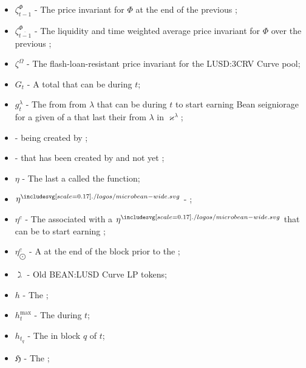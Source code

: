 \documentclass[class=article, crop=false]{standalone}
\begin{document}
\begin{itemize}[topsep=0pt, itemsep=3pt,leftmargin=16pt]
    \item[] $\zeta^{\Phi}_{t-1}$ - \hypertarget{ht97}{The price invariant for $\Phi$ at the end of the previous };
    \item[] $\zeta^{\Phi}_{\overline{t-1}}$ - \hypertarget{ht98}{The liquidity and time weighted average price invariant for $\Phi$ over the previous };
    \item[] $\zeta^{\Omega}$ - \hypertarget{ht99}{The flash-loan-resistant price invariant for the LUSD:3CRV Curve pool};
    \item[] $G_t$ - \hypertarget{ht100}{A  total  that can be  during $t$};
    \item[] $g_{t}^{\lambda}$ - \hypertarget{ht101}{The  from  from \hyperlink{ht126}{$\lambda$}  that can be  during $t$ to start earning Bean seigniorage for a given  of a  that last  their  from \hyperlink{ht126}{$\lambda$}  in $\varkappa^{\lambda}$};
    \item[]  - \hypertarget{ht102}{ being created by };
    \item[]  - \hypertarget{ht103}{ that has been created by  and not yet };
    \item[] $\eta$ - \hypertarget{ht104}{The last  a  called the  function};
    \item[] $\eta^{\bean}$ - \hypertarget{ht105}{ \Bean};
    \item[] $\eta^{c}$ - \hypertarget{ht106}{The   associated with a  $\eta^{\bean}$ that can be  to start earning };
    \item[] $\eta_{\bigodot}^c$ - \hypertarget{ht107}{A    at the end of the block prior to the };
    \item[] $\gimel$ - \hypertarget{ht108}{Old BEAN:LUSD Curve LP tokens};
    \item[] $h$ - \hypertarget{ht110}{The };
    \item[] $h_t^{\text{max}}$ - The  during $t$;
    \item[] $h_{t_q}$ - The  in block $q$ of $t$;
    \item[] $\mathfrak{H}$ - \hypertarget{ht111}{The };

\end{itemize}
\end{document}
